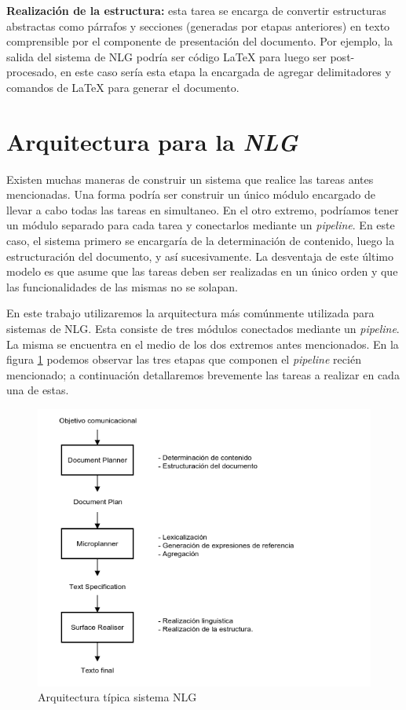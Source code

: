 \bigskip
\noindent
\textbf{Realización de la estructura:} esta tarea se encarga de convertir estructuras abstractas como párrafos y secciones (generadas por etapas anteriores) en texto comprensible por el componente de presentación del documento. Por ejemplo, la salida del sistema de NLG podría ser código LaTeX para luego ser post-procesado, en este caso sería esta etapa la encargada de agregar delimitadores y comandos de LaTeX para generar el documento. 

\section{Arquitectura para la \textit{NLG}}
Existen muchas maneras de construir un sistema que realice las tareas antes mencionadas. Una forma podría ser construir un único módulo encargado de llevar a cabo todas las tareas en simultaneo. En el otro extremo, podríamos tener un módulo separado para cada tarea y conectarlos mediante un \emph{pipeline}. En este caso, el sistema primero se encargaría de la determinación de contenido, luego la estructuración del documento, y así sucesivamente. La desventaja de este último modelo es que asume que las tareas deben ser realizadas en un único orden y que las funcionalidades de las mismas no se solapan.

En este trabajo utilizaremos la arquitectura más comúnmente utilizada para sistemas de NLG. Esta consiste de tres módulos conectados mediante un \emph{pipeline}. La misma se encuentra en el medio de los dos extremos antes mencionados. En la figura \ref{fig:png_arquitectura} podemos observar las tres etapas que componen el \emph{pipeline} recién mencionado; a continuación detallaremos brevemente las tareas a realizar en cada una de estas.

\begin{figure}[H]
  	\centering
	\includegraphics[scale=0.6]{img/arquitectura.png}
	\caption{Arquitectura típica sistema NLG}
  	\label{fig:png_arquitectura}
\end{figure}

